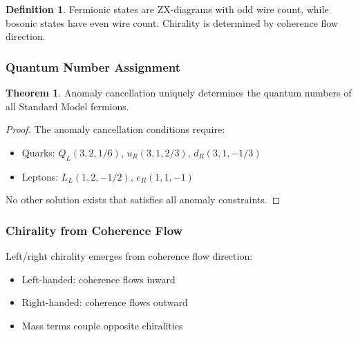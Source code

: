 \documentclass[11pt]{article}
\theoremstyle{definition}
\newtheorem{theorem}{Theorem}[section]
\newtheorem{definition}{Definition}[section]
\begin{document}
\begin{definition}
Fermionic states are ZX-diagrams with odd wire count, while bosonic states have even wire count. Chirality is determined by coherence flow direction.
\end{definition}

\subsubsection{Quantum Number Assignment}

\begin{theorem}
Anomaly cancellation uniquely determines the quantum numbers of all Standard Model fermions.
\end{theorem}

\begin{proof}
The anomaly cancellation conditions require:
\begin{itemize}
\item Quarks: $Q_L(3,2,1/6)$, $u_R(3,1,2/3)$, $d_R(3,1,-1/3)$
\item Leptons: $L_L(1,2,-1/2)$, $e_R(1,1,-1)$
\end{itemize}
No other solution exists that satisfies all anomaly constraints.
\end{proof}

\subsubsection{Chirality from Coherence Flow}

Left/right chirality emerges from coherence flow direction:
\begin{itemize}
\item Left-handed: coherence flows inward
\item Right-handed: coherence flows outward
\item Mass terms couple opposite chiralities
\end{itemize}
\end{document}
